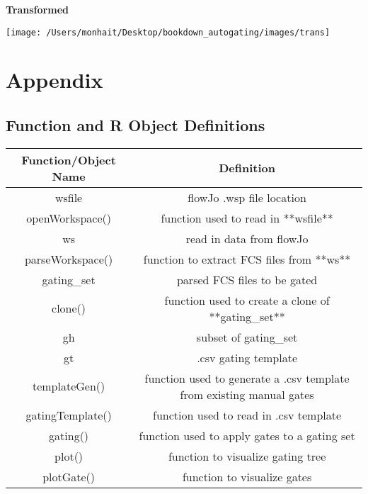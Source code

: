 \documentclass[]{book}
\begin{document}
\textbf{Transformed}

\texttt{[image: /Users/monhait/Desktop/bookdown\_autogating/images/trans]}

\hypertarget{appendix}{%
\chapter{Appendix}\label{appendix}}

\hypertarget{function-and-r-object-definitions}{%
\section{Function and R Object Definitions}\label{function-and-r-object-definitions}}

\begin{tabular}{c|c}
\hline
Function/Object Name & Definition\\
\hline
wsfile & flowJo .wsp file location\\
\hline
openWorkspace() & function used to read in **wsfile**\\
\hline
ws & read in data from flowJo\\
\hline
parseWorkspace() & function to extract FCS files from **ws**\\
\hline
gating\_set & parsed FCS files to be gated\\
\hline
clone() & function used to create a clone of **gating\_set**\\
\hline
gh & subset of gating\_set\\
\hline
gt & .csv gating template\\
\hline
templateGen() & function used to generate a .csv template from existing manual gates\\
\hline
gatingTemplate() & function used to read in .csv template\\
\hline
gating() & function used to apply gates to a gating set\\
\hline
plot() & function to visualize gating tree\\
\hline
plotGate() & function to visualize gates\\
\hline
\end{tabular}
\end{document}

